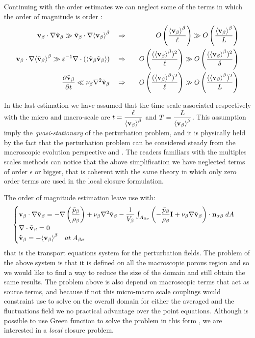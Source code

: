 Continuing with the order estimates we can neglect some of the terms in which the order of magnitude is order :
\begin{eqnarray}
\textbf{v}_{\beta} \cdot \nabla \tilde{\textbf{v}}_{\beta} \gg \tilde{\textbf{v}}_{\beta} \cdot \nabla {\left< \textbf{v}_{\beta}\right>}^{\beta} \quad &\Rightarrow&  \quad O\left(\dfrac{{\left< \textbf{v}_{\beta} \right>}^{\beta}}{\ell}\right) \gg O\left(\dfrac{{\left< \textbf{v}_{\beta} \right>}^{\beta}}{L} \right) \\
\textbf{v}_{\beta} \cdot \nabla {\left< \tilde{\textbf{v}}_{\beta}\right>}^{\beta} \gg  \varepsilon^{-1} \nabla \cdot \left({\left< \tilde{\textbf{v}}_{\beta} \tilde{\textbf{v}}_{\beta} \right>}\right)  \quad &\Rightarrow& \quad O\left(\dfrac{({\left< \textbf{v}_{\beta} \right>}^{\beta})^2}{\ell}\right) \gg O\left(\dfrac{({\left< \textbf{v}_{\beta} \right>}^{\beta})^2}{\delta} \right) \\
\dfrac{\partial \tilde{\textbf{v}}_{\beta}}{\partial t} \ll \nu_{\beta} \nabla^2 \tilde{\textbf{v}}_{\beta}  \quad &\Rightarrow&  \quad O\left(\dfrac{({\left< \textbf{v}_{\beta} \right>}^{\beta})^2}{\ell}\right) \gg O\left(\dfrac{({\left< \textbf{v}_{\beta} \right>}^{\beta})^2}{L} \right) 
\end{eqnarray}

In the last estimation we have assumed that the time scale associated respectively with the micro and macro-scale are $t = \dfrac{\ell}{{\left< \textbf{v}_{\beta} \right>}^{\beta}}$ and $T =\dfrac{L}{{\left< \textbf{v}_{\beta} \right>}^{\beta}}$.
This assumption imply the \textit{quasi-stationary} of the perturbation problem, and it is physically held by the fact that the perturbation problem can be considered steady from the macroscopic evolution perspective \citet{davit2013homogenization} and \citet{zhu2014study}.
The readers familiars with the multiples scales methods can notice that the above simplification we have neglected terms of order $\epsilon$ or bigger, that is coherent with the same theory in which only zero order terms are used in the local closure formulation.

The order of magnitude estimation leave use with:
\begin{eqnarray}
	\begin{cases}
		\textbf{v}_{\beta} \cdot \nabla \tilde{\textbf{v}}_{\beta} = -\nabla \left(\dfrac{\tilde{p}_{\beta}}{\rho_{\beta}}\right) + \nu_{\beta} \nabla^2 \tilde{\textbf{v}}_{\beta} - \dfrac{1}{V_\beta} \int_{A_{\beta \sigma}} \left(-\dfrac{\tilde{p}_{\beta}}{\rho_{\beta}} \mathbf{I}  + \nu_{\beta} \nabla \tilde{\textbf{v}}_{\beta} \right) \cdot \mathbf{n}_{\sigma \beta} \;dA  \\
		\nabla \cdot \tilde{\textbf{v}}_{\beta} = 0  \\
		\tilde{\textbf{v}}_{\beta} = -{\left< \textbf{v}_{\beta} \right>}^{\beta} \quad at \; A_{\beta \sigma}
	\end{cases}
\label{eq:vans_mom_}
\end{eqnarray}
that is the transport equations system for the perturbation fields.
The problem of the above system is that it is defined on all the macroscopic porous region and so we would like to find a way to reduce the size of the domain and still obtain the same results.
The problem above is also depend on macroscopic terms that act as source terms, and because if not this micro-macro scale couplings would constraint use to solve on the overall domain for either the averaged and the fluctuations field we no practical advantage over the point equations.
Although is possible to use Green function to solve the problem in this form \citet{wood2013volume}, we are interested in a \textit{local} closure problem.

